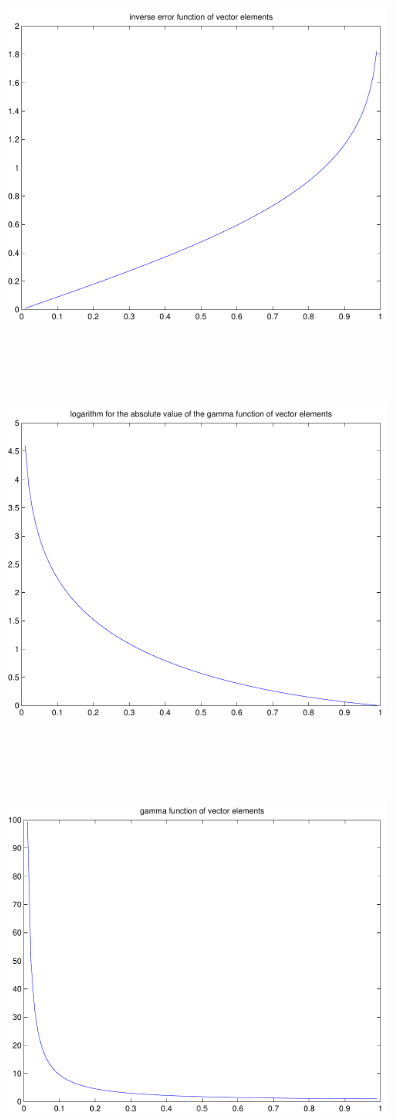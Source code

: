 \documentclass[9pt]{article}
\theoremstyle{plain}
\theoremstyle{definition}
\theoremstyle{remark}
\numberwithin{equation}{section}
\begin{document}
\includegraphics[width=10.0cm,height=10.0cm]{klVSLErfInv.pdf}

\includegraphics[width=10.0cm,height=10.0cm]{klVSLLGamma.pdf}

\includegraphics[width=10.0cm,height=10.0cm]{klVSLTGamma.pdf}
\end{document}
